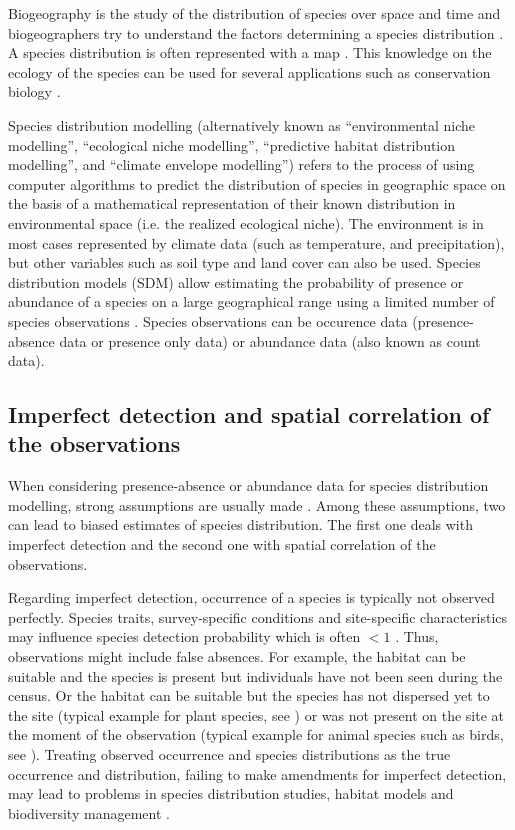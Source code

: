 \documentclass[a4paper, 12pt, leqno]{article}\usepackage[]{graphicx}\usepackage[]{color}
\begin{document}
Biogeography is the study of the distribution of species over space and time and
biogeographers try to understand the factors determining a species distribution
\citep{Smith1868,Wallace1876}. A species distribution is often represented with a map
\citep{Wallace1876}. This knowledge on the ecology of the species can be used for several
applications such as conservation biology \citep{Thuiller2014}.

Species distribution modelling (alternatively known as ``environmental niche modelling'',
``ecological niche modelling'', ``predictive habitat distribution modelling'', and
``climate envelope modelling'') refers to the process of using computer algorithms to
predict the distribution of species in geographic space on the basis of a mathematical
representation of their known distribution in environmental space (i.e. the realized
ecological niche). The environment is in most cases represented by climate data (such as
temperature, and precipitation), but other variables such as soil type and land cover can
also be used. Species distribution models (SDM) allow estimating the probability of
presence or abundance of a species on a large geographical range using a limited number of
species observations \citep{Guisan2000, Elith2009}. Species observations can be occurence
data (presence-absence data or presence only data) or abundance data (also known as count
data).

\subsection{Imperfect detection and spatial correlation of the observations}

When considering presence-absence or abundance data for species distribution modelling,
strong assumptions are usually made \citep{Guisan2005,Sinclair2010,Araujo2006}. Among
these assumptions, two can lead to biased estimates of species distribution. The first one
deals with imperfect detection and the second one with spatial correlation of the
observations.

Regarding imperfect detection, occurrence of a species is typically not observed
perfectly. Species traits, survey-specific conditions and site-specific characteristics
may influence species detection probability which is often $<1$ \citep{Chen2013}. Thus,
observations might include false absences. For example, the habitat can be suitable and
the species is present but individuals have not been seen during the census. Or the
habitat can be suitable but the species has not dispersed yet to the site (typical example
for plant species, see \citet{Latimer2006}) or was not present on the site at the moment
of the observation (typical example for animal species such as birds, see
\citet{Kery2005}). Treating observed occurrence and species distributions as the true
occurrence and distribution, failing to make amendments for imperfect detection, may lead
to problems in species distribution studies, habitat models and biodiversity management
\citep{Latimer2006,Lahoz-Monfort2014,Kery2008}.
\end{document}
